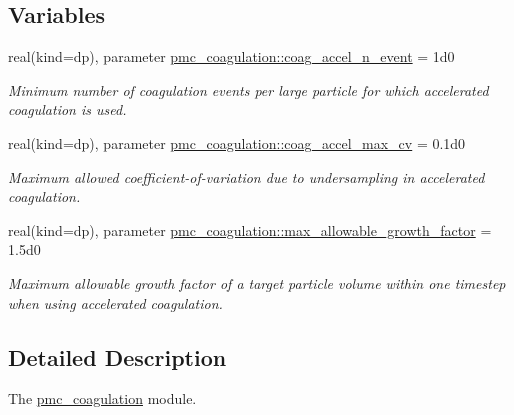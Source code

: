 \subsection*{Variables}
\begin{DoxyCompactItemize}
\item 
real(kind=dp), parameter \mbox{\hyperlink{namespacepmc__coagulation_ae04bc0968f517899ce26a23b550181f5}{pmc\+\_\+coagulation\+::coag\+\_\+accel\+\_\+n\+\_\+event}} = 1d0
\begin{DoxyCompactList}\small\item\em Minimum number of coagulation events per large particle for which accelerated coagulation is used. \end{DoxyCompactList}\item 
real(kind=dp), parameter \mbox{\hyperlink{namespacepmc__coagulation_a82e17b9c1710579759ee0d0599b9b4f1}{pmc\+\_\+coagulation\+::coag\+\_\+accel\+\_\+max\+\_\+cv}} = 0.\+1d0
\begin{DoxyCompactList}\small\item\em Maximum allowed coefficient-\/of-\/variation due to undersampling in accelerated coagulation. \end{DoxyCompactList}\item 
real(kind=dp), parameter \mbox{\hyperlink{namespacepmc__coagulation_a56c874842d78c24cc24a82623569418e}{pmc\+\_\+coagulation\+::max\+\_\+allowable\+\_\+growth\+\_\+factor}} = 1.\+5d0
\begin{DoxyCompactList}\small\item\em Maximum allowable growth factor of a target particle volume within one timestep when using accelerated coagulation. \end{DoxyCompactList}\end{DoxyCompactItemize}


\subsection{Detailed Description}
The \mbox{\hyperlink{namespacepmc__coagulation}{pmc\+\_\+coagulation}} module. 

